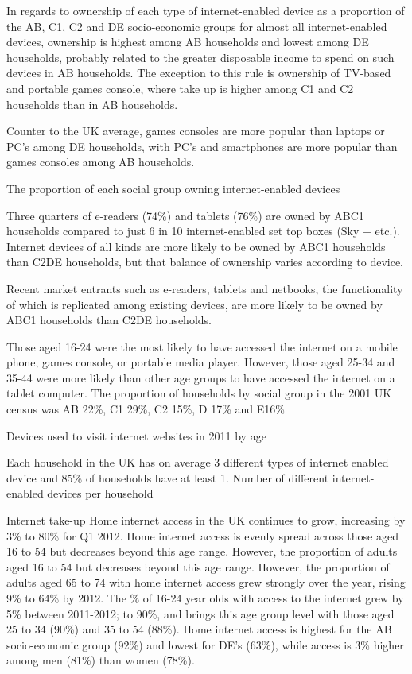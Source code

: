 \documentclass[letterpaper,10pt,openany,oneside,english]{sphinxmanual}
\begin{document}
In regards to ownership of each type of internet-enabled device as a proportion of the AB, C1,
C2 and DE socio-economic groups \textendash{} for almost all internet-enabled devices, ownership is
highest among AB households and lowest among DE households, probably related to the
greater disposable income to spend on such devices in AB households. The exception to this
rule is ownership of TV-based and portable games console, where take up is higher among C1
and C2 households than in AB households.

Counter to the UK average, games consoles are more popular than laptops or PC’s among DE
households, with PC’s and smartphones are more popular than games consoles among AB
households.

The proportion of each social group owning internet-enabled devices

Three quarters of e-readers (74\%) and tablets (76\%) are owned by ABC1 households compared
to just 6 in 10 internet-enabled set top boxes (Sky + etc.). Internet devices of all kinds are more
likely to be owned by ABC1 households than C2DE households, but that balance of ownership
varies according to device.

Recent market entrants such as e-readers, tablets and netbooks, the functionality of which is
replicated among existing devices, are more likely to be owned by ABC1 households than C2DE
households.

Those aged 16-24 were the most likely to have accessed the internet on a mobile phone, games
console, or portable media player. However, those aged 25-34 and 35-44 were more likely than
other age groups to have accessed the internet on a tablet computer. The proportion of
households by social group in the 2001 UK census was AB 22\%, C1 29\%, C2 15\%, D 17\% and
E16\%

Devices used to visit internet websites in 2011 by age

Each household in the UK has on average 3 different types of internet enabled device and 85\%
of households have at least 1.
Number of different internet-enabled devices per household

Internet take-up
Home internet access in the UK continues to grow, increasing by 3\% to 80\% for Q1 2012. Home
internet access is evenly spread across those aged 16 to 54 but decreases beyond this age
range. However, the proportion of adults aged 16 to 54 but decreases beyond this age range.
However, the proportion of adults aged 65 to 74 with home internet access grew strongly over
the year, rising 9\% to 64\% by 2012. The \% of 16-24 year olds with access to the internet grew
by 5\% between 2011-2012; to 90\%, and brings this age group level with those aged 25 to 34
(90\%) and 35 to 54 (88\%).
Home internet access is highest for the AB socio-economic group (92\%) and lowest for DE’s
(63\%), while access is 3\% higher among men (81\%) than women (78\%).
\end{document}
